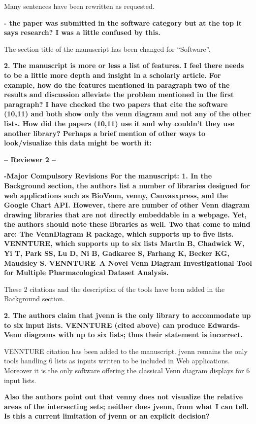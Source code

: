 \documentclass[10pt,stdletter,dateno,sigleft]{newlfm} %
\begin{document}
\begin{newlfm}
Many sentences have been rewritten as requested. 

\textbf{- the paper was submitted in the software category but at the top it
says research? I was a little confused by this.}

The section title of the manuscript has been changed for ``Software''.

\textbf{2. The manuscript is more or less a list of features. I feel there needs
to be a little more depth and insight in a scholarly article. For example, how
do  the features mentioned in paragraph two of the results and discussion
alleviate  the problem mentioned in the first paragraph? I have checked the two
papers  that cite the software (10,11) and both show only the venn diagram and
not  any of the other lists. How did the papers (10,11) use it and why couldn't 
they use another library? Perhaps a brief mention of other ways to
look/visualize this data might be worth it:}



\textbf{-- Reviewer 2 --}

\textbf{ -Major Compulsory Revisions
For the manuscript:
1. In the Background section, the authors list a number of libraries designed
for web applications such as BioVenn, venny, Canvasxpress, and the Google Chart 
API. However, there are number of other Venn diagram drawing libraries that are 
not directly embeddable in a webpage. Yet, the authors should note these
libraries as well. Two that come to mind are: The VennDiagram R package, which 
supports up to five lists. VENNTURE, which supports up to six lists Martin B, 
Chadwick W, Yi T, Park SS, Lu D, Ni B, Gadkaree S, Farhang K, Becker KG,
Maudsley  S. VENNTURE–A Novel Venn Diagram Investigational Tool for Multiple 
Pharmacological Dataset Analysis.}

These 2 citations and the description of the tools have been added in the
Background section.

\textbf{2. The authors claim that jvenn is the only library to accommodate up
to six input lists. VENNTURE (cited above) can produce Edwards-Venn
diagrams with up to six lists; thus their statement is incorrect.}

VENNTURE citation has been added to the manuscript. jvenn remains the only
tools handling 6 lists as inputs written to be included in Web applications.
Moreover it is the only software offering the classical Venn diagram displays
for 6 input lists.

\textbf{Also the authors point out that venny does not visualize the relative
areas of the intersecting sets; neither does jvenn, from what I can
tell. Is this a current limitation of jvenn or an explicit decision?}


\end{newlfm}
\end{document}
